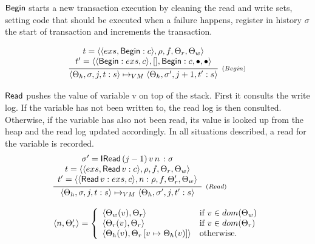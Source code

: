 \documentclass[sigplan, anonymous, review]{acmart}
\theoremstyle{definition}
\newcommand{\C}[1]{\red{\mathsf{#1}}}
\begin{document}
\ensuremath{\C{Begin}} starts a new transaction execution by cleaning the read and write sets, setting code that should be executed
when a failure happens, register in history $\sigma$ the start of transaction and increments the transaction.

\[
  \infer[_{(Begin)}]
        { \langle \Theta_h,\sigma,j, t : s\rangle \mapsto_{VM}
          \langle \Theta_h,\sigma',j + 1, t' : s\rangle }
        {\begin{array}{c}
           t = \langle \langle exs, \ensuremath{\C{Begin}} : c\rangle,\rho, f,\Theta_r,\Theta_w\rangle \\ 
           t' = \langle \langle \ensuremath{\C{Begin}} : exs, c\rangle, [] , \ensuremath{\C{Begin}} : c,\bullet,\bullet\rangle
         \end{array}}
\]

\ensuremath{\C{Read}} pushes the value of variable v on top of the stack. First it consults the write log.
If the variable has not been written to, the read log is then consulted. Otherwise, if the variable has
also not been read, its value is looked up from the heap and the read log updated accordingly. In all situations described,
a read for the variable is recorded.
\[
  \begin{array}{l}
  \infer[_{(Read)}]
        {\langle \Theta_h,\sigma,j,t : s \rangle \mapsto_{VM}
         \langle \Theta_h,\sigma',j,t' : s \rangle}
        {\begin{array}{c}
            \sigma' = \ensuremath{\C{IRead}}\,(j-1)\,v\,n\, : \sigma\\
            t = \langle \langle exs, \ensuremath{\C{Read}}\,v : c\rangle,\rho,f,\Theta_r,\Theta_w\rangle \\
            t' = \langle  \langle \ensuremath{\C{Read}}\,v : exs, c\rangle ,n : \rho,f,\Theta_r',\Theta_w\rangle \\
         \end{array}} \\ \\
  \langle n , \Theta_r' \rangle 
       = \left \{
            \begin{array}{ll}
               \langle \Theta_w(v), \Theta_r \rangle & \text{if } v \in dom(\Theta_w)\\
               \langle \Theta_r(v), \Theta_r \rangle & \text{if } v \in dom(\Theta_r)\\
               \langle \Theta_h(v), \Theta_r\,[v \mapsto \Theta_h(v)]\rangle & \text{otherwise.} 
            \end{array}
         \right .
  \end{array} 
\]
\end{document}
